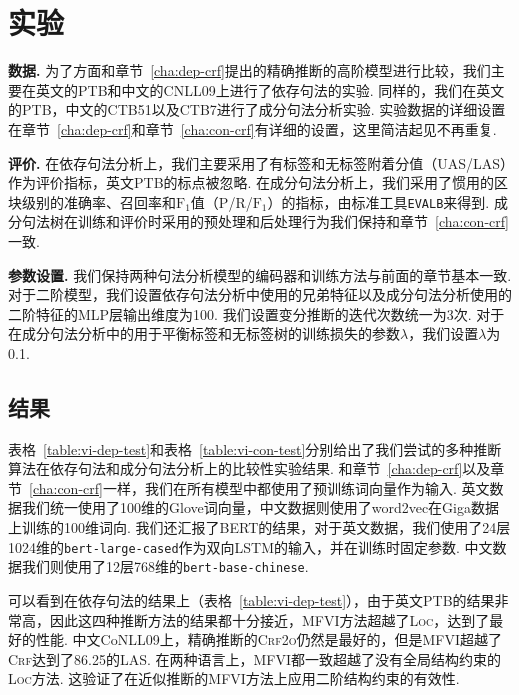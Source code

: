 \section{实验}\label{sec:vi-exp}

\noindent\textbf{数据.}
为了方面和章节~\ref{cha:dep-crf}提出的精确推断的高阶模型进行比较，我们主要在英文的PTB和中文的CNLL09上进行了依存句法的实验.
同样的，我们在英文的PTB，中文的CTB51以及CTB7进行了成分句法分析实验.
实验数据的详细设置在章节~\ref{cha:dep-crf}和章节~\ref{cha:con-crf}有详细的设置，这里简洁起见不再重复.

\noindent\textbf{评价.}
在依存句法分析上，我们主要采用了有标签和无标签附着分值（UAS/LAS）作为评价指标，英文PTB的标点被忽略.
在成分句法分析上，我们采用了惯用的区块级别的准确率、召回率和$\mathrm{F}_1$值（P/R/$\mathrm{F}_1$）的指标，由标准工具\texttt{EVALB}来得到.
成分句法树在训练和评价时采用的预处理和后处理行为我们保持和章节~\ref{cha:con-crf}一致.

\noindent\textbf{参数设置.}
我们保持两种句法分析模型的编码器和训练方法与前面的章节基本一致.
对于二阶模型，我们设置依存句法分析中使用的兄弟特征以及成分句法分析使用的二阶特征的MLP层输出维度为100.
我们设置变分推断的迭代次数统一为3次.
对于在成分句法分析中的用于平衡标签和无标签树的训练损失的参数$\lambda$，我们设置$\lambda$为0.1.



\subsection{结果}
表格~\ref{table:vi-dep-test}和表格~\ref{table:vi-con-test}分别给出了我们尝试的多种推断算法在依存句法和成分句法分析上的比较性实验结果.
和章节~\ref{cha:dep-crf}以及章节~\ref{cha:con-crf}一样，我们在所有模型中都使用了预训练词向量作为输入.
英文数据我们统一使用了100维的Glove词向量，中文数据则使用了word2vec在Giga数据上训练的100维词向.
我们还汇报了BERT的结果，对于英文数据，我们使用了24层1024维的\texttt{bert-large-cased}作为双向LSTM的输入，并在训练时固定参数.
中文数据我们则使用了12层768维的\texttt{bert-base-chinese}.

可以看到在依存句法的结果上（表格~\ref{table:vi-dep-test}），由于英文PTB的结果非常高，因此这四种推断方法的结果都十分接近，\textsc{MFVI}方法超越了\textsc{Loc}，达到了最好的性能.
中文CoNLL09上，精确推断的\textsc{Crf2o}仍然是最好的，但是\textsc{MFVI}超越了\textsc{Crf}达到了86.25的LAS.
在两种语言上，\textsc{MFVI}都一致超越了没有全局结构约束的\textsc{Loc}方法.
这验证了在近似推断的\textsc{MFVI}方法上应用二阶结构约束的有效性.

